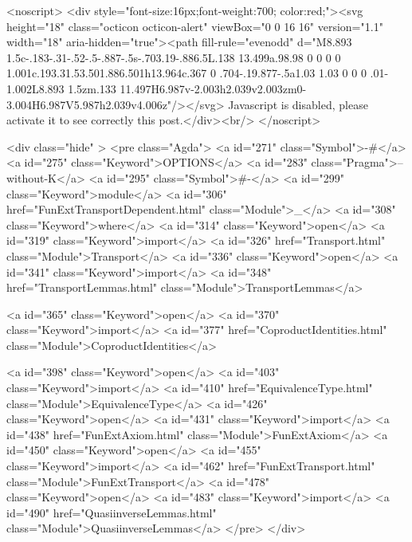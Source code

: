  <noscript>
  <div style="font-size:16px;font-weight:700; color:red;"><svg height="18" class="octicon octicon-alert" viewBox="0 0 16 16" version="1.1" width="18" aria-hidden="true"><path fill-rule="evenodd" d="M8.893 1.5c-.183-.31-.52-.5-.887-.5s-.703.19-.886.5L.138 13.499a.98.98 0 0 0 0 1.001c.193.31.53.501.886.501h13.964c.367 0 .704-.19.877-.5a1.03 1.03 0 0 0 .01-1.002L8.893 1.5zm.133 11.497H6.987v-2.003h2.039v2.003zm0-3.004H6.987V5.987h2.039v4.006z"/></svg> Javascript is disabled, please activate it to see correctly this post.</div><br/>
  </noscript>

  <div class="hide" >
<pre class="Agda">
<a id="271" class="Symbol">{-#</a> <a id="275" class="Keyword">OPTIONS</a> <a id="283" class="Pragma">--without-K</a> <a id="295" class="Symbol">#-}</a>
<a id="299" class="Keyword">module</a> <a id="306" href="FunExtTransportDependent.html" class="Module">_</a> <a id="308" class="Keyword">where</a>
<a id="314" class="Keyword">open</a> <a id="319" class="Keyword">import</a> <a id="326" href="Transport.html" class="Module">Transport</a>
<a id="336" class="Keyword">open</a> <a id="341" class="Keyword">import</a> <a id="348" href="TransportLemmas.html" class="Module">TransportLemmas</a>

<a id="365" class="Keyword">open</a> <a id="370" class="Keyword">import</a> <a id="377" href="CoproductIdentities.html" class="Module">CoproductIdentities</a>

<a id="398" class="Keyword">open</a> <a id="403" class="Keyword">import</a> <a id="410" href="EquivalenceType.html" class="Module">EquivalenceType</a>
<a id="426" class="Keyword">open</a> <a id="431" class="Keyword">import</a> <a id="438" href="FunExtAxiom.html" class="Module">FunExtAxiom</a>
<a id="450" class="Keyword">open</a> <a id="455" class="Keyword">import</a> <a id="462" href="FunExtTransport.html" class="Module">FunExtTransport</a>
<a id="478" class="Keyword">open</a> <a id="483" class="Keyword">import</a> <a id="490" href="QuasiinverseLemmas.html" class="Module">QuasiinverseLemmas</a>
</pre>
</div>

